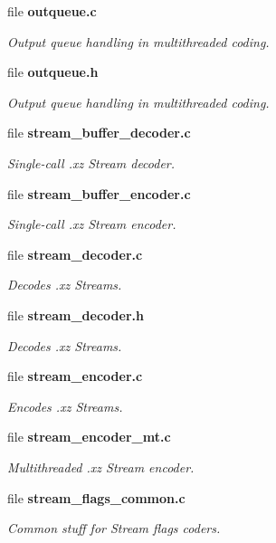 \begin{DoxyCompactItemize}
file \textbf{ outqueue.\+c}
\begin{DoxyCompactList}\small\item\em Output queue handling in multithreaded coding. \end{DoxyCompactList}\item 
file \textbf{ outqueue.\+h}
\begin{DoxyCompactList}\small\item\em Output queue handling in multithreaded coding. \end{DoxyCompactList}\item 
file \textbf{ stream\+\_\+buffer\+\_\+decoder.\+c}
\begin{DoxyCompactList}\small\item\em Single-\/call .xz Stream decoder. \end{DoxyCompactList}\item 
file \textbf{ stream\+\_\+buffer\+\_\+encoder.\+c}
\begin{DoxyCompactList}\small\item\em Single-\/call .xz Stream encoder. \end{DoxyCompactList}\item 
file \textbf{ stream\+\_\+decoder.\+c}
\begin{DoxyCompactList}\small\item\em Decodes .xz Streams. \end{DoxyCompactList}\item 
file \textbf{ stream\+\_\+decoder.\+h}
\begin{DoxyCompactList}\small\item\em Decodes .xz Streams. \end{DoxyCompactList}\item 
file \textbf{ stream\+\_\+encoder.\+c}
\begin{DoxyCompactList}\small\item\em Encodes .xz Streams. \end{DoxyCompactList}\item 
file \textbf{ stream\+\_\+encoder\+\_\+mt.\+c}
\begin{DoxyCompactList}\small\item\em Multithreaded .xz Stream encoder. \end{DoxyCompactList}\item 
file \textbf{ stream\+\_\+flags\+\_\+common.\+c}
\begin{DoxyCompactList}\small\item\em Common stuff for Stream flags coders. \end{DoxyCompactList}\item 

\end{DoxyCompactItemize}

